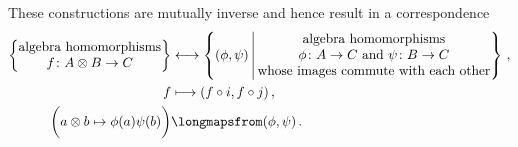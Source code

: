 \begin{recall}
  These constructions are mutually inverse and hence result in a {\onetoone} correspondence
  \begin{align*}
    \left\{
      \begin{tabular}{@{}c@{}}
        algebra homomorphisms \\
        $f \colon A \tensor B \to C$
      \end{tabular}
    \right\}
    &\longonetoone
    \left\{
      (\phi, \psi)
    \suchthat*
      \begin{tabular}{@{}c@{}}
        algebra homomorphisms \\
        $\phi \colon A \to C$ and~$\psi \colon B \to C$ \\
        whose images commute with each other
      \end{tabular}
    \right\}  \,,
    \\
    f
    &\longmapsto
    (f \circ i, f \circ j)  \,,
    \\
    \biggl( a \tensor b \mapsto \phi(a)\psi(b) \biggr)
    &\longmapsfrom
    (\phi, \psi)  \,.
  \end{align*}
\end{recall}


